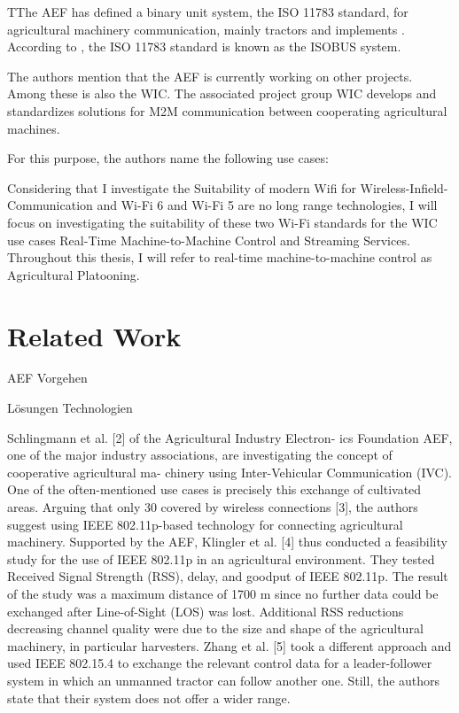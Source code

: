 \documentclass[]{nsm-thesis}
\begin{document}
TThe AEF has defined a binary unit system, the ISO 11783 standard, for agricultural machinery communication, mainly tractors and implements \cite{iglesias_enabling_2014}. According to \textcite{schlingmann_aef_2019}, the ISO 11783 standard is known as the ISOBUS system.

The authors mention that the AEF is currently working on other projects. Among these is also the \ac{WIC}. The associated project group \ac{WIC} develops and standardizes solutions for \ac{M2M} communication between cooperating agricultural machines.

For this purpose, the authors name the following use cases:


Considering that I investigate the Suitability of modern Wifi for Wireless-Infield-Communication and Wi-Fi 6 and Wi-Fi 5 are no long range technologies, I will focus on investigating the suitability of these two Wi-Fi standards for the \ac{WIC} use cases Real-Time Machine-to-Machine Control and Streaming Services. Throughout this thesis, I will refer to real-time machine-to-machine control as Agricultural Platooning.
\section{Related Work}
AEF Vorgehen

Lösungen
Technologien


Schlingmann et al. [2] of the Agricultural Industry Electron-
ics Foundation AEF, one of the major industry associations,
are investigating the concept of cooperative agricultural ma-
chinery using Inter-Vehicular Communication (IVC). One of
the often-mentioned use cases is precisely this exchange of
cultivated areas. Arguing that only 30 %
covered by wireless connections [3], the authors suggest using
IEEE 802.11p-based technology for connecting agricultural
machinery. Supported by the AEF, Klingler et al. [4] thus
conducted a feasibility study for the use of IEEE 802.11p in an
agricultural environment. They tested Received Signal Strength
(RSS), delay, and goodput of IEEE 802.11p. The result of the
study was a maximum distance of 1700 m since no further
data could be exchanged after Line-of-Sight (LOS) was lost.
Additional RSS reductions decreasing channel quality were
due to the size and shape of the agricultural machinery, in
particular harvesters. Zhang et al. [5] took a different approach
and used IEEE 802.15.4 to exchange the relevant control data
for a leader-follower system in which an unmanned tractor can
follow another one. Still, the authors state that their system
does not offer a wider range.
\end{document}
